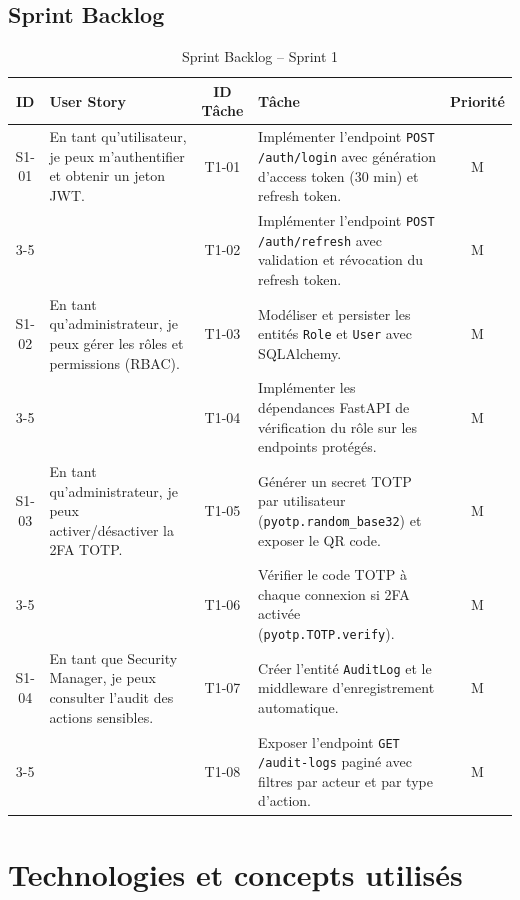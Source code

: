 \subsection{Sprint Backlog}
\begin{table}[H]
\centering
\caption{Sprint Backlog -- Sprint 1}
\label{tab:sprint1-backlog}
\small
\renewcommand{\arraystretch}{1.3}
\begin{tabularx}{\textwidth}{c X c X c}
\hline
\rowcolor{gray!15}
\textbf{ID} & \textbf{User Story} & \textbf{ID Tâche} & \textbf{Tâche} & \textbf{Priorité} \\
\hline
S1-01 & En tant qu'utilisateur, je peux m'authentifier et obtenir un jeton JWT.
  & T1-01 & Implémenter l'endpoint \texttt{POST /auth/login} avec génération d'access token (30 min) et refresh token. & M \\
\cline{3-5}
  & & T1-02 & Implémenter l'endpoint \texttt{POST /auth/refresh} avec validation et révocation du refresh token. & M \\
\hline
S1-02 & En tant qu'administrateur, je peux gérer les rôles et permissions (RBAC).
  & T1-03 & Modéliser et persister les entités \texttt{Role} et \texttt{User} avec SQLAlchemy. & M \\
\cline{3-5}
  & & T1-04 & Implémenter les dépendances FastAPI de vérification du rôle sur les endpoints protégés. & M \\
\hline
S1-03 & En tant qu'administrateur, je peux activer/désactiver la 2FA TOTP.
  & T1-05 & Générer un secret TOTP par utilisateur (\texttt{pyotp.random\_base32}) et exposer le QR code. & M \\
\cline{3-5}
  & & T1-06 & Vérifier le code TOTP à chaque connexion si 2FA activée (\texttt{pyotp.TOTP.verify}). & M \\
\hline
S1-04 & En tant que Security Manager, je peux consulter l'audit des actions sensibles.
  & T1-07 & Créer l'entité \texttt{AuditLog} et le middleware d'enregistrement automatique. & M \\
\cline{3-5}
  & & T1-08 & Exposer l'endpoint \texttt{GET /audit-logs} paginé avec filtres par acteur et par type d'action. & M \\
\hline
\end{tabularx}
\end{table}

\section{Technologies et concepts utilisés}

